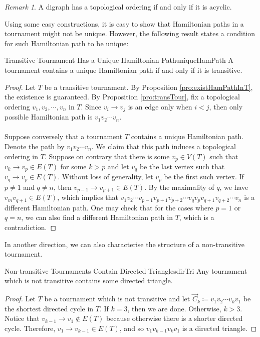 \documentclass[math]{amznotes}
\theoremstyle{remark}
\newtheorem*{remark}{Remark}
\newcommand{\0}{\mathbf{0}}
\newcommand{\1}{\mathbf{1}}
\begin{document}
\begin{notebox}
    \begin{remark}
        A digraph has a topological ordering if and only if it is acyclic.
    \end{remark}
\end{notebox}
Using some easy constructions, it is easy to show that Hamiltonian paths in a tournament might not be unique. However, the following result states a condition for such Hamiltonian path to be unique:
\begin{probox}{Transitive Tournament Has a Unique Hamiltonian Path}{uniqueHamPath}
    A tournament contains a unique Hamiltonian path if and only if it is transitive.
    \tcblower
    \begin{proof}
        Let $T$ be a transitive tournament. By Proposition \ref{pro:existHamPathInT}, the existence is guaranteed. By Proposition \ref{pro:transTour}, fix a topological ordering $v_1, v_2, \cdots, v_n$ in $T$. Since $v_i \to v_j$ is an edge only when $i < j$, then only possible Hamiltonian path is $v_1v_2\cdots v_n$.
        \\\\
        Suppose conversely that a tournament $T$ contains a unique Hamiltonian path. Denote the path by $v_1v_2\cdots v_n$. We claim that this path induces a topological ordering in $T$. Suppose on contrary that there is some $v_p \in V(T)$ such that $v_k \to v_p \in E(T)$ for some $k > p$ and let $v_q$ be the last vertex such that $v_q \to v_p \in E(T)$. Without loss of generality, let $v_p$ be the first such vertex. If $p \neq 1$ and $q \neq n$, then $v_{p - 1} \to v_{p + 1} \in E(T)$. By the maximality of $q$, we have $v_mv_{q + 1} \in E(T)$, which implies that $v_1v_2\cdots v_{p - 1}v_{p + 1}v_{p + 2}\cdots v_qv_pv_{q + 1}v_{q + 2}\cdots v_n$ is a different Hamiltonian path. One may check that for the cases where $p = 1$ or $q = n$, we can also find a different Hamiltonian path in $T$, which is a contradiction.
    \end{proof}
\end{probox}
In another direction, we can also characterise the structure of a non-transitive tournament.
\begin{probox}{Non-transitive Tournaments Contain Directed Triangles}{dirTri}
    Any tournament which is not transitive contains some directed triangle.
    \tcblower
    \begin{proof}
        Let $T$ be a tournament which is not transitive and let $\overrightarrow{C}_k \coloneqq v_1v_2\cdots v_kv_1$ be the shortest directed cycle in $T$. If $k = 3$, then we are done. Otherwise, $k > 3$. Notice that $v_{k - 1} \to v_1 \notin E(T)$ because otherwise there is a shorter directed cycle. Therefore, $v_1 \to v_{k - 1} \in E(T)$, and so $v_1v_{k - 1}v_kv_1$ is a directed triangle.
    \end{proof}
\end{probox}
\end{document}
